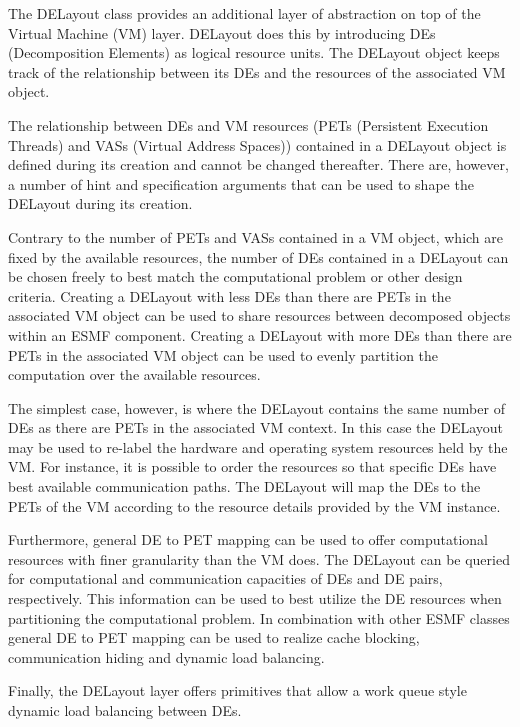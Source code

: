 
The DELayout class provides an additional layer of abstraction on top of the Virtual Machine (VM) layer. DELayout does this by introducing DEs (Decomposition Elements) as logical resource units. The DELayout object keeps track of the relationship between its DEs and the resources of the associated VM object. 

The relationship between DEs and VM resources (PETs (Persistent Execution Threads) and VASs (Virtual Address Spaces)) contained in a DELayout object is defined during its creation and cannot be changed thereafter. There are, however, a number of hint and specification arguments that can be used to shape the DELayout during its creation.

Contrary to the number of PETs and VASs contained in a VM object, which are fixed by the available resources, the number of DEs contained in a DELayout can be chosen freely to best match the computational problem or other design criteria. Creating a DELayout with less DEs than there are PETs in the associated VM object can be used to share resources between decomposed objects within an ESMF component. Creating a DELayout with more DEs than there are PETs in the associated VM object can be used to evenly partition the computation over the available resources.

The simplest case, however, is where the DELayout contains the same number of DEs as there are PETs in the associated VM context. In this case the DELayout may be used to re-label the hardware and operating system resources held by the VM. For instance, it is possible to order the resources so that specific DEs have best available communication paths. The DELayout will map the DEs to the PETs of the VM according to the resource details provided by the VM instance. 

Furthermore, general DE to PET mapping can be used to offer computational resources with finer granularity than the VM does. The DELayout can be queried for computational and communication capacities of DEs and DE pairs, respectively. This information can be used to best utilize the DE resources when partitioning the computational problem. In combination with other ESMF classes general DE to PET mapping can be used to realize cache blocking, communication hiding and dynamic load balancing.

Finally, the DELayout layer offers primitives that allow a work queue style dynamic load balancing between DEs.

